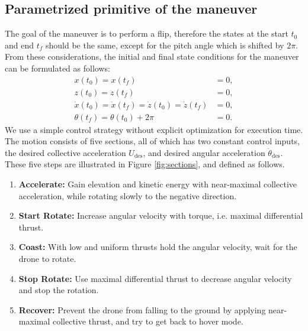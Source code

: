\subsection{Parametrized primitive of the maneuver}\label{sec:sections}
The goal of the maneuver is to perform a flip, therefore the states at the start $t_0$ and end $t_f$ should be the same, except for the pitch angle which is shifted by $2\pi$. From these considerations, the initial and final state conditions for the maneuver can be formulated as follows:
\begin{subequations}
\begin{align}
x(t_0) = x(t_f) &= 0,\\
z(t_0) = z(t_f) &= 0,\\
\dot{x}(t_0) = \dot{x}(t_f) = \dot{z}(t_0) = \dot{z}(t_f) &= 0,\\
\theta(t_f) = \theta(t_0) + 2\pi &= 0.
\end{align}
\end{subequations}
We use a simple control strategy without explicit optimization for execution time. %
The motion consists of five sections, all of which has two constant control inputs, the desired collective acceleration $U_\mathrm{des}$, and desired angular acceleration $\ddot{\theta}_\mathrm{des}$. These five steps are illustrated in Figure \ref{fig:sections}, and defined as follows.
\renewcommand{\baselinestretch}{0.85}\normalsize 
\begin{enumerate}
\item \textbf{Accelerate:} Gain elevation and kinetic energy with near-maximal collective acceleration, while rotating slowly to the negative direction.
\item \textbf{Start Rotate:} Increase angular velocity with torque, i.e. maximal differential thrust.
\item \textbf{Coast:} With low and uniform thrusts hold the angular velocity, wait for the drone to rotate.
\item \textbf{Stop Rotate:} Use maximal differential thrust to decrease angular velocity and stop the rotation.
\item \textbf{Recover:} Prevent the drone from falling to the ground by applying near-maximal collective thrust, and try to get back to hover mode.
\end{enumerate}
\renewcommand{\baselinestretch}{1.15}\normalsize

